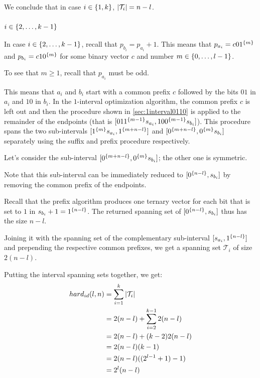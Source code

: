 We conclude that in case $i \in \{1, k\}$,
$\lvert\mathcal{T}_i\rvert = n-l$.

\subsubsection{$i \in \{2, \ldots, k-1\}$}

In case $i \in \{2, \ldots, k-1\}$,
recall that $p_{b_i} = p_{a_i} + 1$.
This means that $p_{a_i} = c 0 1^{\{m\}}$
and $p_{b_i} = c 1 0^{\{m\}}$
for some binary vector $c$
and number $m \in \{0, \ldots, l-1\}$.

To see that $m \geq 1$,
recall that $p_{a_i}$ must be odd.

This means that $a_i$ and $b_i$
start with a common prefix $c$
followed by the bits $01$ in $a_i$
and $10$ in $b_i$.
In the $1$-interval optimization algorithm,
the common prefix $c$ is left out
and then the procedure
shown in \autoref{sec:1interval0110}
is applied to the remainder of the endpoints
(that is
$[01 1^{\{m-1\}} s_{a_i}, 10 0^{\{m-1\}} s_{b_i}]$).
This procedure spans the two sub-intervals
$[1^{\{m\}} s_{a_i}, 1^{\{m+n-l\}}]$
and $[0^{\{m+n-l\}}, 0^{\{m\}} s_{b_i}]$
separately using the suffix and prefix procedure
respectively.

Let's consider the sub-interval
$[0^{\{m+n-l\}}, 0^{\{m\}} s_{b_i}]$;
the other one is symmetric.

Note that this sub-interval can be immediately reduced
to $[0^{\{n-l\}}, s_{b_i}]$
by removing the common prefix of the endpoints.

Recall that the prefix algorithm
produces one ternary vector
for each bit that is set to $1$
in $s_{b_i} + 1 = 1^{\{n-l\}}$.
The returned spanning set of
$[0^{\{n-l\}}, s_{b_i}]$
thus has the size $n-l$.

Joining it with the spanning set of the complementary
sub-interval
$[s_{a_i}, 1^{\{n-l\}}]$
and prepending the respective common prefixes,
we get a spanning set $\mathcal{T}_i$ of size $2(n-l)$.

\hfill

Putting the interval spanning sets together,
we get:
\begin{align*}
hard_{id}(l, n) &= \sum_{i=1}^k{\lvert\mathcal{T}_i\rvert} \\
&= 2 (n-l) + \sum_{i=2}^{k-1}{2 (n-l)} \\
&= 2 (n-l) + (k-2) 2 (n-l) \\
&= 2 (n-l) (k-1) \\
&= 2 (n-l) ((2^{l-1} + 1) - 1) \\
&= 2^l (n-l)
\end{align*}

